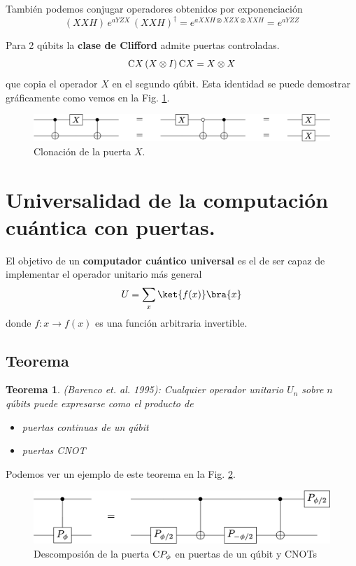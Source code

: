 \documentclass[a4paper,11pt]{book} %
\newtheorem{teorema_contador}{Teorema}
\newcommand{\Teorema}[1]{
		\begin{mybox_gray2}{}
			\begin{teorema_contador}
				 #1 
			\end{teorema_contador} 
		\end{mybox_gray2}
	}
\numberwithin{equation}{chapter}
\newcommand{\cg}[1]{{\rm C}#1}
\begin{document}
También podemos conjugar operadores obtenidos por exponenciación
	$$
	(XXH) \, e^{aYZX} \,  (XXH)^\dagger =e^{a XXH \otimes XZX \otimes XXH} =  e^{a YZZ}
	$$

Para 2 qúbits la \textbf{clase de Clifford} admite puertas controladas.
$$
\cg{X} \, (X\otimes I)\,  \cg{X} = X \otimes X
$$
que copia el operador $X$ en el segundo qúbit. Esta identidad se puede demostrar gráficamente como vemos en la Fig. \ref{Fig_elementos_clone_X}.
	\begin{figure}[H]
	\centering 
	\includegraphics[width=0.9\linewidth]{Figuras/Fig_elementos_clone_X}
	\caption{Clonación de la puerta $X$.}
	\label{Fig_elementos_clone_X}
	\end{figure}


	\section{Universalidad de la computación cuántica con puertas.} \label{sec_elementos_universalidad}

El objetivo de un \textbf{computador cuántico universal} es el de ser capaz de implementar el operador unitario más general
	$$
	U  = \sum_x \ket{f(x)}\bra{x}
	$$
donde $f: x \to f(x)$ es una función arbitraria invertible.

    	\subsection{Teorema}



	\Teorema{ (\textit{Barenco et. al. 1995}): 
	Cualquier operador unitario $U_n$ sobre $n$ qúbits puede expresarse como el 
	producto de 
	\begin{itemize}
		\item puertas continuas de \textit{un qúbit}
		\item puertas CNOT
	\end{itemize}
	}

Podemos ver un ejemplo de este teorema en la Fig. \ref{Fig_elementos_Equiv_Phase}.
	\begin{figure}[H]
	\centering 
	\includegraphics[width=0.60\linewidth]{Figuras/Fig_elementos_Equiv_Phase}
	\caption{Descomposión de la puerta $\cg{P_\phi}$ en puertas de un qúbit y CNOTs}
	\label{Fig_elementos_Equiv_Phase}
	\end{figure}
\end{document}
